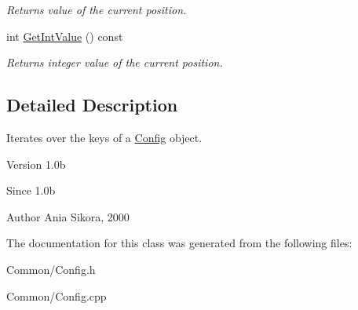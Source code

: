 \begin{DoxyCompactItemize}
\begin{DoxyCompactList}\small\item\em Returns value of the current position. \end{DoxyCompactList}\item 
\hypertarget{class_common_1_1_config_1_1_key_iterator_a3a148b7ae0989eebcd68e9f49490b335}{int \hyperlink{class_common_1_1_config_1_1_key_iterator_a3a148b7ae0989eebcd68e9f49490b335}{Get\-Int\-Value} () const }\label{class_common_1_1_config_1_1_key_iterator_a3a148b7ae0989eebcd68e9f49490b335}

\begin{DoxyCompactList}\small\item\em Returns integer value of the current position. \end{DoxyCompactList}\end{DoxyCompactItemize}


\subsection{Detailed Description}
Iterates over the keys of a \hyperlink{class_common_1_1_config}{Config} object. 

\begin{DoxyVersion}{Version}
1.\-0b 
\end{DoxyVersion}
\begin{DoxySince}{Since}
1.\-0b 
\end{DoxySince}
\begin{DoxyAuthor}{Author}
Ania Sikora, 2000 
\end{DoxyAuthor}


The documentation for this class was generated from the following files\-:\begin{DoxyCompactItemize}
\item 
Common/Config.\-h\item 
Common/Config.\-cpp\end{DoxyCompactItemize}
